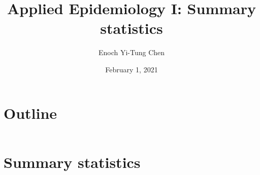 

\title[Applied Epi I: Summary statistics]{Applied Epidemiology I: Summary statistics}
\date{February 1, 2021}
\author[Enoch Yi-Tung Chen]{Enoch Yi-Tung Chen}




\begin{frame}
\maketitle 
\end{frame}



\section*{Outline}
\begin{frame}{\secname}
 \begin{columns}[t]
        \begin{column}{.5\textwidth}
            \tableofcontents[sections={1-4}]
        \end{column}
        \begin{column}{.5\textwidth}
            \tableofcontents[sections={5-7}]
        \end{column}
\end{columns}
\end{frame}
\section{Summary statistics}

